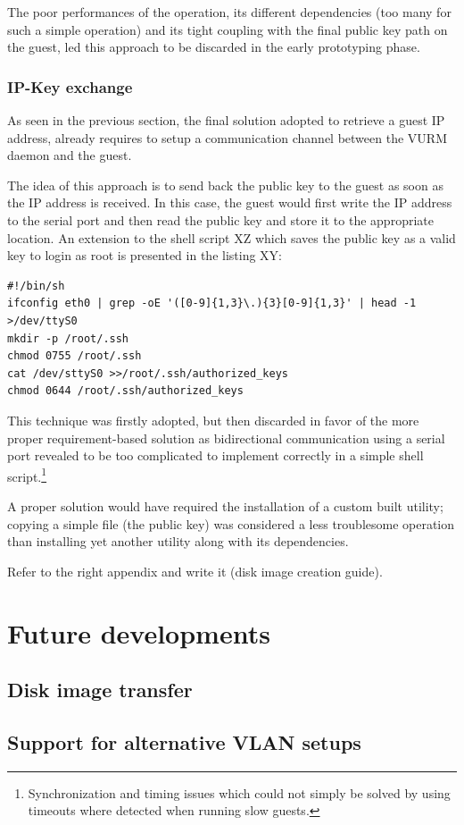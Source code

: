 The poor performances of the operation, its different dependencies (too many for such a simple operation) and its tight coupling with the final public key path on the guest, led this approach to be discarded in the early prototyping phase.

\subsubsection{IP-Key exchange}

As seen in the previous section, the final solution adopted to retrieve a guest IP address, already requires to setup a communication channel between the VURM daemon and the guest.

The idea of this approach is to send back the public key to the guest as soon as the IP address is received. In this case, the guest would first write the IP address to the serial port and then read the public key and store it to the appropriate location. An extension to the shell script XZ which saves the public key as a valid key to login as root is presented in the listing XY:

\lstset{language=bash,caption=Shell script to write the IP address to the serial port,label=lst:serialip}
\begin{lstlisting}
#!/bin/sh
ifconfig eth0 | grep -oE '([0-9]{1,3}\.){3}[0-9]{1,3}' | head -1 >/dev/ttyS0
mkdir -p /root/.ssh
chmod 0755 /root/.ssh
cat /dev/sttyS0 >>/root/.ssh/authorized_keys
chmod 0644 /root/.ssh/authorized_keys
\end{lstlisting}

This technique was firstly adopted, but then discarded in favor of the more proper requirement-based solution as bidirectional communication using a serial port revealed to be too complicated to implement correctly in a simple shell script.\footnote{Synchronization and timing issues which could not simply be solved by using timeouts where detected when running slow guests.}

A proper solution would have required the installation of a custom built utility; copying a simple file (the public key) was considered a less troublesome operation than installing yet another utility along with its dependencies.


\begin{todo}
Refer to the right appendix and write it (disk image creation guide).
\end{todo}


\section{Future developments}

\subsection{Disk image transfer}

\subsection{Support for alternative VLAN setups}
